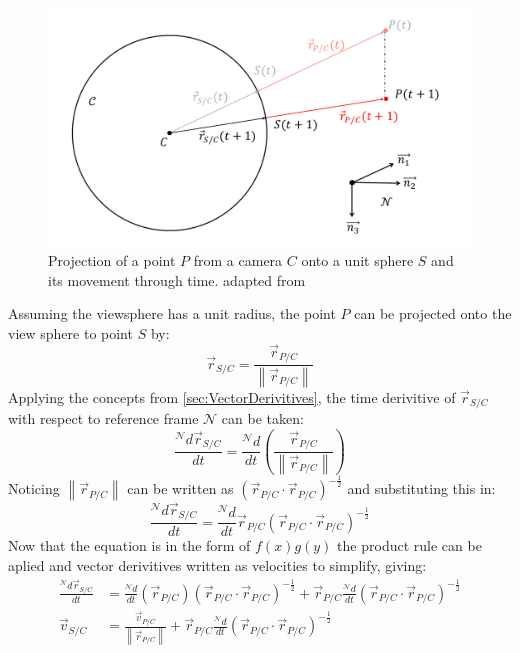 \documentclass{UoNMCHA}
\newcommand{\norm}[1]{\left\lVert#1\right\rVert}
\numberwithin{equation}{section}
\begin{document}
\begin{figure}[ht]\label{fig:MeasurementModel}
    \begin{center}
        \includegraphics[width=.8\linewidth]{Figures/MeasurementModel}
        \caption{Projection of a point $P$ from a camera $C$ onto a unit sphere $S$ and its movement through time. adapted from \cite{TimsFYP}}
    \end{center}
\end{figure}
Assuming the viewsphere has a unit radius, the point $P$ can be projected onto the view sphere to point $S$ by:
\begin{equation}\label{eq:pointOnSphere}
	\vec{r}_{S/C} = \frac{\vec{r}_{P/C}}{\norm{\vec{r}_{P/C}}}
\end{equation}
Applying the concepts from \cref{sec:VectorDerivitives}, the time derivitive of $\vec{r}_{S/C}$ with respect to reference frame $\mathcal{N}$ can be taken: 
\begin{equation}
	\frac{{}^\mathcal{N}d\vec{r}_{S/C}}{dt} = \frac{{}^\mathcal{N}d}{dt}\left(\frac{\vec{r}_{P/C}}{\norm{\vec{r}_{P/C}}}\right)
\end{equation}
Noticing $\norm{\vec{r}_{P/C}}$ can be written as $(\vec{r}_{P/C} \cdot \vec{r}_{P/C})^{-\frac{1}{2}}$ and substituting this in:
\begin{equation}
	\frac{{}^\mathcal{N}d\vec{r}_{S/C}}{dt}	= \frac{{}^\mathcal{N}d}{dt}\vec{r}_{P/C}(\vec{r}_{P/C} \cdot \vec{r}_{P/C})^{-\frac{1}{2}}
\end{equation}
Now that the equation is in the form of $f(x)g(y)$ the product rule can be aplied and vector derivitives written as velocities to simplify, giving:
\begin{equation}
	\begin{split}
		\frac{{}^\mathcal{N}d\vec{r}_{S/C}}{dt} &=\frac{{}^\mathcal{N}d}{dt}\left(\vec{r}_{P/C}\right)(\vec{r}_{P/C} \cdot \vec{r}_{P/C})^{-\frac{1}{2}} + \vec{r}_{P/C}\frac{{}^\mathcal{N}d}{dt}(\vec{r}_{P/C} \cdot \vec{r}_{P/C})^{-\frac{1}{2}}\\
		\vec{v}_{S/C} &=\frac{\vec{v}_{P/C}}{\norm{\vec{r}_{P/C}}} + \vec{r}_{P/C}\frac{{}^\mathcal{N}d}{dt}(\vec{r}_{P/C} \cdot \vec{r}_{P/C})^{-\frac{1}{2}}
	\end{split}
\end{equation}
\end{document}
